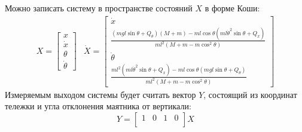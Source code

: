 Можно записать систему в пространстве состояний $X$ в форме Коши: 
\begin{equation}
    \begin{array}{cc}
        X = \begin{bmatrix} 
            x \\
            \dot{x} \\
            \theta \\
            \dot{\theta}
    \end{bmatrix} & 
    \dot{X} = \begin{bmatrix}
        \dot{x} \\
        \frac{(mgl\sin\theta + Q_{\theta})(M + m) - ml\cos\theta(ml\dot{\theta}^2\sin\theta + Q_x)}{ml^2(M + m - m\cos^2\theta)} \\ 
        \dot{\theta} \\
        \frac{ml^2(ml\dot{\theta}^2\sin\theta + Q_x) - ml\cos\theta(mgl\sin\theta + Q_{\theta})}{ml^2(M + m - m\cos^2\theta)}
    \end{bmatrix}
    \end{array}
\end{equation}
Измеряемым выходом системы будет считать вектор $Y$, состоящий из координат тележки и угла отклонения маятника от вертикали:
\begin{equation}
    Y = \begin{bmatrix}
        1 & 0 & 1 & 0 \\
    \end{bmatrix} X
\end{equation}

